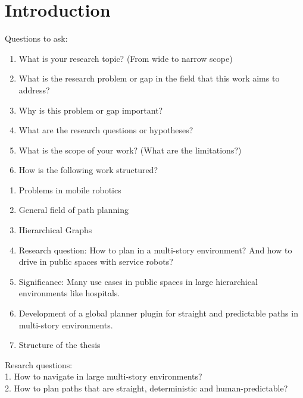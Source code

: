 \chapter{Introduction}
\label{sec:Introduction}
Questions to ask:
\begin{enumerate}
    \item What is your research topic? (From wide to narrow scope)
    \item What is the research problem or gap in the field that this work aims to address?
    \item Why is this problem or gap important?
    \item What are the research questions or hypotheses? 
    \item What is the scope of your work? (What are the limitations?)
    \item How is the following work structured?
\end{enumerate}

\begin{enumerate}
    \item Problems in mobile robotics
    \item General field of path planning
    \item Hierarchical Graphs
    \item Research question: How to plan in a multi-story environment? And how to drive in public spaces with service robots?
    \item Significance: Many use cases in public spaces in large hierarchical environments like hospitals.
    \item Development of a global planner plugin for straight and predictable paths in multi-story environments.
    \item Structure of the thesis
\end{enumerate}

Resarch questions:\\
1. How to navigate in large multi-story environments?\\
2. How to plan paths that are straight, deterministic and human-predictable?\\